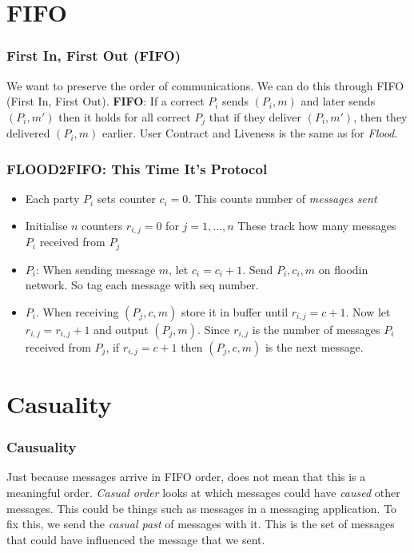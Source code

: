 \section{FIFO}
    \begin{frame}
        \frametitle{First In, First Out (FIFO)}
            We want to preserve the order of communications. We can do this through FIFO (First In, First Out). 
            \textbf{FIFO}: If a correct $P_i$ sends $(P_i, m)$ and later sends $(P_i, m')$ then it holds for all correct $P_j$ that if they deliver $(P_i, m')$, then they delivered $(P_i, m)$ earlier. 
            User Contract and Liveness is the same as for \textit{Flood}. 
    \end{frame}
    \begin{frame}
        \frametitle{FLOOD2FIFO: This Time It's Protocol}
            \begin{itemize}
                \item Each party $P_i$ sets counter $c_i = 0$. This counts number of \textit{messages sent}
                \item Initialise $n$ counters $r_{i, j} = 0$ for $j = 1, ..., n$ These track how many messages $P_i$ received from $P_j$
                \item $P_i$: When sending message $m$, let $c_i = c_i + 1$. Send $P_i, c_i, m$ on floodin network. So tag each message with seq number.
                \item $P_i$. When receiving $(P_j, c, m)$ store it in buffer until $r_{i, j} = c + 1$. Now let $r_{i, j} = r_{i, j} + 1$ and output $(P_j, m)$. Since $r_{i, j}$ is the number of messages $P_i$ received from $P_j$, if $r_{i, j} = c + 1$ then $(P_j, c, m)$ is the next message. 
            \end{itemize}
    \end{frame}


\section{Casuality}
    \begin{frame}
        \frametitle{Causuality}
            Just because messages arrive in FIFO order, does not mean that this is a meaningful order. \textit{Casual order} looks at which messages could have \textit{caused} other messages. This could be things such as messages in a messaging application. To fix this, we send the \textit{casual past} of messages with it. This is the set of messages that could have influenced the message that we sent. 

    \end{frame}

